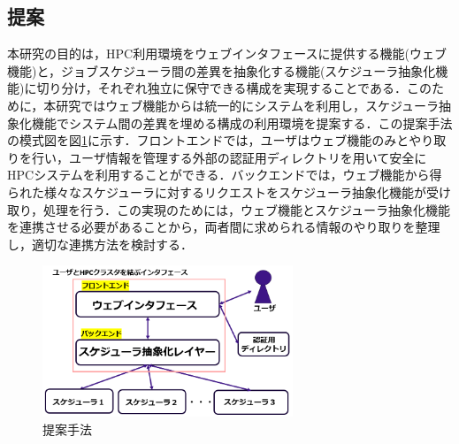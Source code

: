 \documentclass[a4paper,oneside,twocolumn,notitlepage,dvipdfmx]{jsarticle}
\begin{document}
\subsection{提案}
本研究の目的は，HPC利用環境をウェブインタフェースに提供する機能(ウェブ機能)と，ジョブスケジューラ間の差異を抽象化する機能(スケジューラ抽象化機能)に切り分け，それぞれ独立に保守できる構成を実現することである．このために，本研究ではウェブ機能からは統一的にシステムを利用し，スケジューラ抽象化機能でシステム間の差異を埋める構成の利用環境を提案する．この提案手法の模式図を図\ref{fig1}に示す．フロントエンドでは，ユーザはウェブ機能のみとやり取りを行い，ユーザ情報を管理する外部の認証用ディレクトリを用いて安全にHPCシステムを利用することができる．バックエンドでは，ウェブ機能から得られた様々なスケジューラに対するリクエストをスケジューラ抽象化機能が受け取り，処理を行う．この実現のためには，ウェブ機能とスケジューラ抽象化機能を連携させる必要があることから，両者間に求められる情報のやり取りを整理し，適切な連携方法を検討する．\par

\begin{figure}[tb]
  \centering
  \includegraphics[width=75mm]{./fig/proposed_method.png}
  \caption{提案手法}
  \label{fig1}
\end{figure}

\vspace{3\baselineskip}
\end{document}
